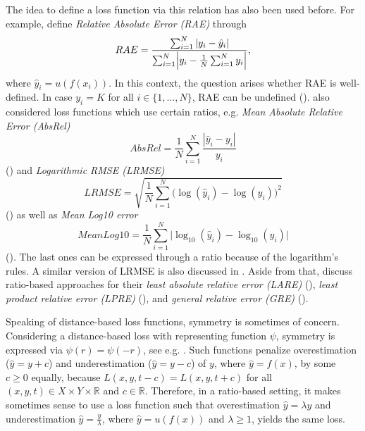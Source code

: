 \documentclass[10pt]{article}
\newcommand{\R}{\mathbb{R}}
\newcommand{\XY}{X \times Y}
\begin{document}
The idea to define a loss function via this relation has also been used before.
For example, \cite[Chapter III.D]{JadonEtAl2022} define \textit{Relative Absolute Error (RAE)} through
\begin{equation*}
	RAE = \frac{\sum_{i = 1}^N |y_i-\hat{y}_i|}{\sum_{i = 1}^N \Bigl|y_i - \frac{1}{N} \sum_{i =1}^N y_i\Bigr| },
\end{equation*}
where $\hat{y}_i=u(f(x_i))$. 
In this context, the question arises whether RAE is well-defined. 
In case $y_i = K$ for all $i \in \{1, \dots, N\}$, RAE can be undefined (\cite[Tab. IV]{JadonEtAl2022}).
\cite{TervenEtAl2025} also considered loss functions which use certain ratios, e.g. \textit{Mean Absolute Relative Error (AbsRel)} 
\begin{equation*}
	AbsRel = \frac{1}{N} \sum_{i = 1}^N \frac{|\hat{y}_i-y_i|}{y_i}
\end{equation*}
(\cite[Chapter 8.2.1]{TervenEtAl2025}) and \textit{Logarithmic RMSE (LRMSE)}
\begin{equation*}
	LRMSE = \sqrt{\frac{1}{N}\sum_{i = 1}^N \bigl(\log(\hat{y}_i)-\log(y_i)\bigr)^2}
\end{equation*}
(\cite[Chapter 8.2.3]{TervenEtAl2025}) as well as \textit{Mean Log10 error}
\begin{equation*}
	Mean Log10 = \frac{1}{N} \sum_{i=1}^{N} \bigl|\log_{10}(\hat{y}_i)-\log_{10}(y_i)\bigr|
\end{equation*}
(\cite[Chapter 8.2.5]{TervenEtAl2025}). 
The last ones can be expressed through a ratio because of the logarithm's rules. 
A similar version of LRMSE is also discussed in \cite[Chapter 3.1.8]{LiEtAl2025}.
Aside from that, \cite{ChenEtAl2016LPRE} discuss ratio-based approaches for their \textit{least absolute relative error (LARE)} (\cites[(3)]{ChenEtAl2010LARE}[(2)]{ChenEtAl2016LPRE}), \textit{least product relative error (LPRE)} (\cite[(3), (4)]{ChenEtAl2016LPRE}), and \textit{general relative error (GRE)} (\cite[(8)]{ChenEtAl2016LPRE}). \par
Speaking of distance-based loss functions, symmetry is sometimes of concern. 
Considering a dis\-tance\--based loss with representing function $\psi$, symmetry is expressed via $\psi(r) = \psi(-r)$, see e.g. \cite[Def. 4.11 (ii)]{Steinwart2007}. Such functions penalize overestimation ($\hat{y} = y + c$) and underestimation ($\hat{y} = y - c$) of $y$, where $\hat{y}=f(x)$, by some $c \geq 0$ equally, because $L(x,y,t-c) = L(x,y,t+c)$ for all $(x,y,t) \in \XY \times \R$ and $c \in \R$.
Therefore, in a ratio-based setting, it makes sometimes sense to use a loss function such that overestimation $\hat{y} = \lambda y$ and underestimation $\hat{y} = \frac{y}{\lambda}$, where $\hat{y}=u(f(x))$ and $\lambda \geq 1$, yields the same loss.
\end{document}
